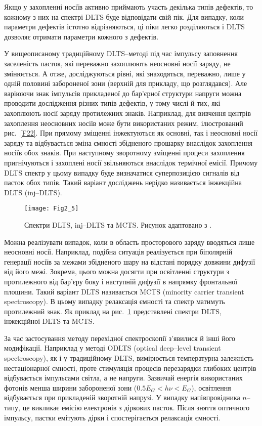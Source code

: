 Якщо у захопленні носіїв активно приймають участь декілька типів дефектів, то кожному
з них на спектрі DLTS буде відповідати свій пік.
Для випадку, коли параметри дефектів істотно відрізняються, ці піки легко розділяються
і DLTS дозволяє отримати параметри кожного з дефектів.


У вищеописаному традиційному DLTS--методі під час імпульсу заповнення заселеність пасток,
які переважно захоплюють неосновні носії заряду, не змінюється.
А отже, досліджуються рівні, які знаходяться, переважно, лише у одній половині  забороненої зони
(верхній для прикладу, що розглядався).
Але варіюючи знак імпульсів прикладеної до бар'єрної структури напруги можна
проводити дослідження різних типів дефектів, у тому числі й тих, які захоплюють носії заряду протилежних знаків.
Наприклад, для вивчення центрів захоплення неосновних носіїв може бути використаних режим,
ілюстрований рис.~\ref{F22}.
При прямому зміщенні інжектуються як основні, так і неосновні носії заряду та
відбувається зміна ємності збідненого прошарку внаслідок захоплення носіїв
обох знаків.
При наступному зворотному зміщенні процеси захоплення пригнічуються і
захоплені носії звільняються внаслідок термічної емісії.
Причому DLTS спектр у цьому випадку буде визначатися суперпозицією сигналів
від пасток обох типів.
Такий варіант досліджень нерідко називається інжекційна DLTS (inj--DLTS).

\begin{figure}[!b]
\center
\vspace{-5mm}
\texttt{[image: Fig2\_5]}
\vspace{-3mm}
\caption{Спектри DLTS, inj--DLTS та MCTS.
Рисунок адаптовано з \cite{tuomisto2019}.
}
\vspace{-3mm}
\label{F25}
\end{figure}

Можна реалізувати випадок, коли в область просторового заряду вводяться лише неосновні носії.
Наприклад, подібна ситуація реалізується  при біполярній генерації носіїв за межами збідненого шару
на відстані порядку довжини дифузії від його межі.
Зокрема, цього можна досягти при освітленні структури з протилежного від бар'єру боку
і наступній дифузії в напрямку фронтальної площини.
Такий варіант DLTS називається MCTS (minority carrier transient spectroscopy).
В цьому випадку релаксація ємності та спектр матимуть протилежний знак.
Як приклад на рис.~\ref{F25} представлені спектри DLTS, інжекційної DLTS та MCTS.


За час застосування методу перехідної спектроскопії з'явилися й інші його модифікації.
Наприклад у методі ODLTS (optical deep--level transient spectroscopy), як і у традиційному DLTS,
вимірюється температурна залежність нестаціонарної ємності, проте стимуляція
процесів перезарядки глибоких центрів відбувається імпульсами світла, а не напруги.
Зазвичай енергія використаних фотонів менша ширини забороненої
зони ($0.5E_G<h\nu<E_G$),
освітлення відбувається при прикладеній зворотній напрузі.
У випадку напівпровідника $n$--типу, це викликає емісію електронів
з діркових пасток.
Після зняття оптичного імпульсу, пастки емітують дірки і спостерігається релаксація ємності.

